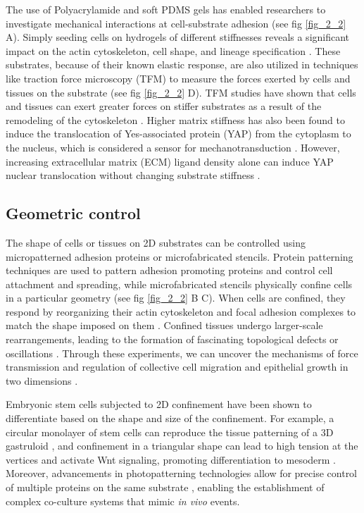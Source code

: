 The use of Polyacrylamide and soft PDMS gels has enabled researchers to investigate mechanical interactions at cell-substrate adhesion (see fig \ref{fig_2_2} A). Simply seeding cells on hydrogels of different stiffnesses reveals a significant impact on the actin cytoskeleton, cell shape, and lineage specification \cite{yeung2005,  engler2006}. These substrates, because of their known elastic response, are also utilized in techniques like traction force microscopy (TFM) to measure the forces exerted by cells and tissues on the substrate \cite{harris1980,  gomez-gonzalez2020} (see fig \ref{fig_2_2} D). TFM studies have shown that cells and tissues can exert greater forces on stiffer substrates as a result of the remodeling of the cytoskeleton \cite{elosegui-artola2016}. Higher matrix stiffness has also been found to induce the translocation of Yes-associated protein (YAP) from the cytoplasm to the nucleus, which is considered a sensor for mechanotransduction \cite{elosegui-artola2017}. However, increasing extracellular matrix (ECM) ligand density alone can induce YAP nuclear translocation without changing substrate stiffness \cite{stanton2019}.

\hypertarget{geometric-control}{%
\subsection{Geometric control}\label{geometric-control}}

The shape of cells or tissues on 2D substrates can be controlled using micropatterned adhesion proteins or microfabricated stencils. Protein patterning techniques are used to pattern adhesion promoting proteins and control cell attachment and spreading, while microfabricated stencils physically confine cells in a particular geometry (see fig \ref{fig_2_2} B C). When cells are confined, they respond by reorganizing their actin cytoskeleton and focal adhesion complexes to match the shape imposed on them \cite{vignaud2012}. Confined tissues undergo larger-scale rearrangements, leading to the formation of fascinating topological defects or oscillations \cite{tlili2018,  balasubramaniam2021,  guillamat2022}. Through these experiments, we can uncover the mechanisms of force transmission and regulation of collective cell migration and epithelial growth in two dimensions \cite{nelson2005,  vedula2012,  deforet2014}.

Embryonic stem cells subjected to 2D confinement have been shown to differentiate based on the shape and size of the confinement. For example, a circular monolayer of stem cells can reproduce the tissue patterning of a 3D gastruloid \cite{warmflash2014}, and confinement in a triangular shape can lead to high tension at the vertices and activate Wnt signaling, promoting differentiation to mesoderm \cite{muncie2020}. Moreover, advancements in photopatterning technologies allow for precise control of multiple proteins on the same substrate \cite{guyon2021, prahl2022}, enabling the establishment of complex co-culture systems that mimic \textit{in vivo} events.

